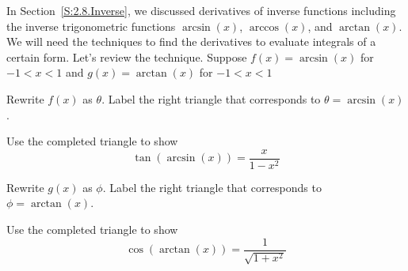 \begin{pa} \label{PA:5.3}
In Section~\ref{S:2.8.Inverse}, we discussed derivatives of inverse functions including the inverse trigonometric functions $\arcsin (x)$, $\arccos (x)$, and $\arctan (x)$. We will need the techniques to find the derivatives to evaluate integrals of a certain form. Let's review the technique.
Suppose $f(x) = \arcsin (x)$ for $-1<x<1$ and $g(x)=\arctan(x)$ for $-1<x<1$
	\be
		\item Rewrite $f(x)$ as $\theta$. Label the right triangle that corresponds to $\theta=\arcsin(x)$. 
		\item Use the completed triangle to show $$ \tan (\arcsin (x)) = \frac{x}{1-x^2} $$
		\item Rewrite $g(x)$ as $\phi$. Label the right triangle that corresponds to $\phi=\arctan(x)$.
		\item Use the completed triangle to show $$ \cos (\arctan (x)) = \frac{1}{\sqrt{1+x^2}} $$
	\ee
\end{pa} 
\afterpa

